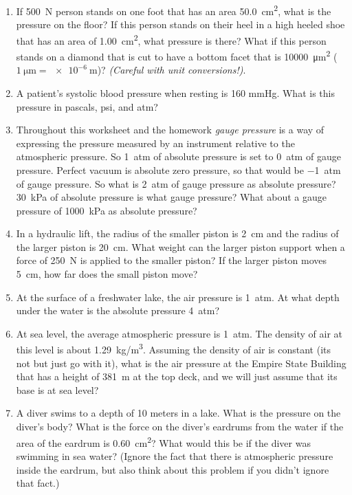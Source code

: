 \begin{enumerate}
	\setlength\itemsep{2 in}
	
	\item If \SI{500}{N} person stands on one foot that has an area \SI{50.0}{cm^2}, what is the pressure on the floor? If this person stands on their heel in a high heeled shoe that has an area of \SI{1.00}{cm^2}, what pressure is there? What if this person stands on a diamond that is cut to have a bottom facet that is \SI{10000}{\micro\meter^2} ($\SI{1}{\micro\meter}=\SI{e-6}{\meter}$)? \emph{(Careful with unit conversions!)}.
	
	\item
	A patient's systolic blood pressure when resting is 160 mmHg. What is this pressure in pascals, psi, and atm?
	
	\item
	Throughout this worksheet and the homework \emph{gauge pressure} is a way of expressing the pressure measured by an instrument relative to the atmospheric pressure. So \SI{1}{atm} of absolute pressure is set to \SI{0}{atm} of gauge pressure. Perfect vacuum is absolute zero pressure, so that would be \SI{-1}{atm} of gauge pressure. So what is \SI{2}{atm} of gauge pressure as absolute pressure? \SI{30}{\kilo\pascal} of absolute pressure is what gauge pressure? What about a gauge pressure of \SI{1000}{\kilo\pascal} as absolute pressure?
	
	\item
	In a hydraulic lift, the radius of the smaller piston is \SI{2}{cm} and the radius of the larger piston is \SI{20}{cm}. What weight can the larger piston support when a force of \SI{250}{N} is applied to the smaller piston? If the larger piston moves \SI{5}{cm}, how far does the small piston move?\hugeskip
	
	\item
	At the surface of a freshwater lake, the air pressure is \SI{1}{atm}. At what depth under the water is the absolute pressure \SI{4}{atm}? \bigskip
	
	\item 
	At sea level, the average atmospheric pressure is \SI{1}{atm}. The density of air at this level is about \SI{1.29}{kg/m^3}. Assuming the density of air is constant (its not but just go with it), what is the air pressure at the Empire State Building that has a height of \SI{381}{\meter} at the top deck, and we will just assume that its base is at sea level?
	
	\item 
	A diver swims to a depth of 10 meters in a lake. What is the pressure on the diver's body? What is the force on the diver's eardrums from the water if the area of the eardrum is \SI{0.60}{cm^2}? What would this be if the diver was swimming in sea water? (Ignore the fact that there is atmospheric pressure inside the eardrum, but also think about this problem if you didn't ignore that fact.)
	

\end{enumerate}
